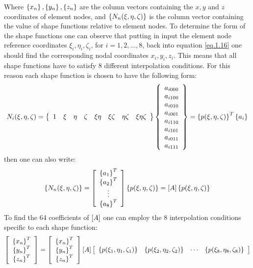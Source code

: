 Where  $\left\lbrace{x_n}\right \rbrace,\left\lbrace{y_n}\right \rbrace,\left\lbrace{z_n}\right \rbrace$ are the column vectors containing the $x,y$ and $z$ coordinates of element nodes, and  $\left\lbrace{N_n(\xi,\eta,\zeta)}\right \rbrace$ is the column vector containing the value of shape functions relative to element nodes.
To determine the form of the shape functions one can observe that putting in input the element node reference coordinates $\xi_i,\eta_i,\zeta_i$, for $i=1,2,...,8$, back  into equation \ref{eq.1.16} one should find the corresponding nodal coordinates $x_i,y_i,z_i$. This means that all shape functions have to satisfy 8 different interpolation conditions. For this reason each shape function is chosen to have the following form:
\begin{equation}
N_i(\xi,\eta,\zeta)=\left\lbrace{\begin{array}{cccccccc}
1&\xi&\eta&\zeta&\xi\eta&\xi\zeta&\eta\zeta&\xi\eta\zeta
\end{array}}\right \rbrace\left\lbrace{\begin{array}{c}
a_{i000}\\a_{i100}\\a_{i010}\\a_{i001}\\a_{i110}\\a_{i101}\\a_{i011}\\a_{i111}
\end{array}}\right \rbrace=\left\lbrace{p(\xi,\eta,\zeta)}\right \rbrace^T\left\lbrace{a_i}\right \rbrace
\end{equation}
then one can also write:
\begin{equation}
\left\lbrace{N_n(\xi,\eta,\zeta)}\right \rbrace=\left[{\begin{array}{c}
\left\lbrace{a_1}\right \rbrace^T\\
\left\lbrace{a_2}\right \rbrace^T\\
\vdots\\
\left\lbrace{a_8}\right \rbrace^T
\end{array}}\right]\left\lbrace{p(\xi,\eta,\zeta)}\right \rbrace=\left[{A}\right]\left\lbrace{p(\xi,\eta,\zeta)}\right \rbrace
\end{equation}
To find the 64 coefficients of $\left[{A}\right]$ one can employ the 8 interpolation conditions specific to each shape function:
\begin{equation}
\label{eq1.19}
\left[{\begin{array}{c}\left\lbrace{x_n}\right \rbrace^T\\\left\lbrace{y_n}\right \rbrace^T\\\left\lbrace{z_n}\right \rbrace^T\end{array}}\right]=\left[{\begin{array}{c}\left\lbrace{x_n}\right \rbrace^T\\\left\lbrace{y_n}\right \rbrace^T\\\left\lbrace{z_n}\right \rbrace^T\end{array}}\right]\left[{A}\right]\left[{\begin{array}{cccc}
\left\lbrace{p(\xi_1,\eta_1,\zeta_1)}\right \rbrace&\left\lbrace{p(\xi_2,\eta_2,\zeta_2)}\right \rbrace&\cdots&\left\lbrace{p(\xi_8,\eta_8,\zeta_8)}\right \rbrace
\end{array}}\right]
\end{equation}
